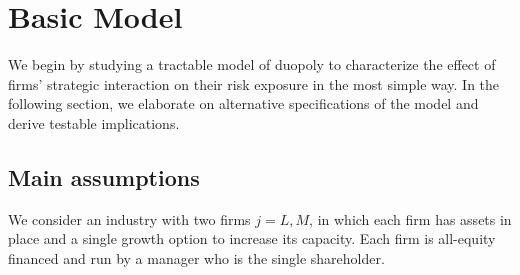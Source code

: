 \documentclass[nogrid,nosurname,sort&compress]{RFS}
\begin{document}

\section{Basic Model}\label{s1}

We begin by studying a tractable model of duopoly to characterize the effect of firms' strategic
interaction on their risk exposure in the most simple way. In the following section, we
elaborate on alternative specifications of the model and derive testable implications.

\subsection{Main assumptions}

We consider an industry with two firms $j=L,M$, in which each firm has assets in place and a
single growth option to increase its capacity. Each firm is all-equity financed and run by a
manager who is the single shareholder.
\end{document}

